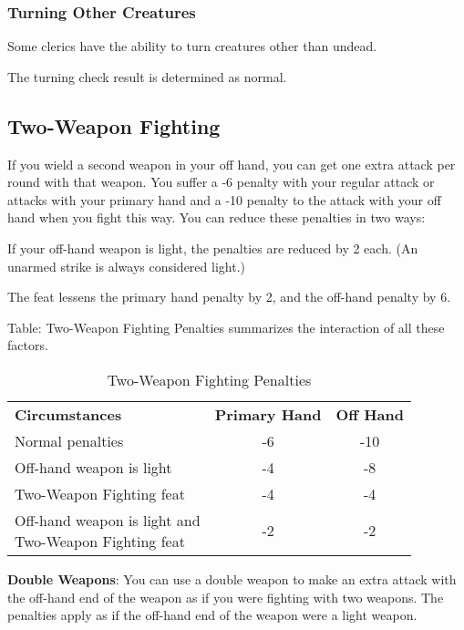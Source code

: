 \subsubsection{Turning Other Creatures}

Some clerics have the ability to turn creatures other than undead.

The turning check result is determined as normal.

\subsection{Two-Weapon Fighting}

If you wield a second weapon in your off hand, you can get one extra attack per 
round with that weapon. You suffer a -6 penalty with your regular attack or attacks 
with your primary hand and a -10 penalty to the attack with your off hand when 
you fight this way. You can reduce these penalties in two ways:

\begin{itemize*}
\item If your off-hand weapon is light, the penalties are reduced by 2 each. (An unarmed strike is always considered light.)
\item The  feat lessens the primary hand penalty by 2, and the off-hand penalty by 6.
\end{itemize*}

Table: Two-Weapon Fighting Penalties summarizes the interaction of all these factors.

\begin{table}[htb]
\mcinherit
\caption{Two-Weapon Fighting Penalties}
\centering
\begin{tabular}{l c c}
\textbf{Circumstances} & \textbf{Primary Hand} & \textbf{Off Hand}\\
Normal penalties & -6 & -10\\
Off-hand weapon is light & -4 & -8\\
Two-Weapon Fighting feat & -4 & -4\\
\shortstack{Off-hand weapon is light and\\Two-Weapon Fighting feat} & -2 & -2\\
\end{tabular}
\end{table}

\textbf{Double Weapons}: You can use a double weapon to make an extra attack with 
the off-hand end of the weapon as if you were fighting with two weapons. The penalties 
apply as if the off-hand end of the weapon were a light weapon.

